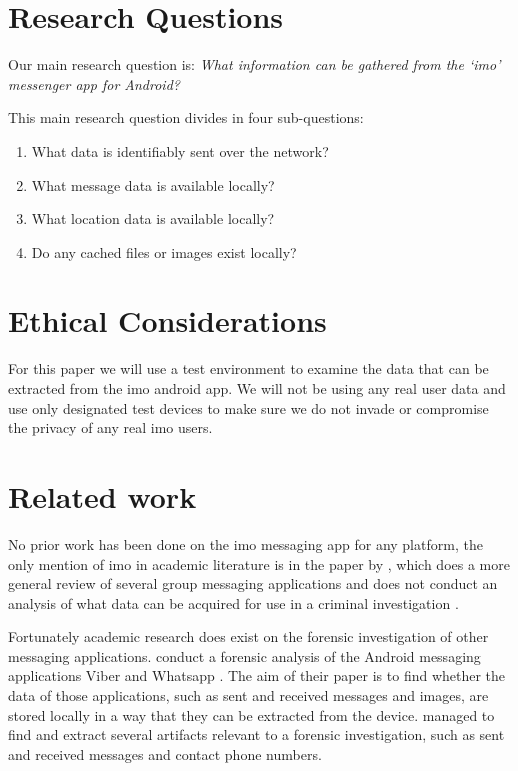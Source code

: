 \documentclass[conference]{IEEEtran}
\begin{document}
\section{Research Questions}\label{sec:researchq}

Our main research question is:
{\it What information can be gathered from the `imo' messenger app for Android?}

This main research question divides in four sub-questions:

\begin{enumerate}
    \item What data is identifiably sent over the network?
    \item What message data is available locally?
    \item What location data is available locally?
    \item Do any cached files or images exist locally?
\end{enumerate}


\section{Ethical Considerations}\label{sec:ethics}

For this paper we will use a test environment to examine the data that can be
extracted from the imo android app. We will not be using any real user data and
use only designated test devices to make sure we do not invade or compromise the
privacy of any real imo users.


\section{Related work}\label{sec:relwork}

No prior work has been done on the imo messaging app for any platform, the only
mention of imo in academic literature is in the paper by \citeauthor{zhu}, which
does a more general review of several group messaging applications and does not
conduct an analysis of what data can be acquired for use in a criminal
investigation \cite{zhu}.

Fortunately academic research does exist on the forensic investigation of other
messaging applications. \citeauthor{mahajan2013forensic} conduct a forensic
analysis of the Android messaging applications Viber and Whatsapp
\cite{mahajan2013forensic}. The aim of their paper is to find whether the data
of those applications, such as sent and received messages and images, are stored
locally in a way that they can be extracted from the device.
\citeauthor{mahajan2013forensic} managed to find and extract several artifacts
relevant to a forensic investigation, such as sent and received messages and
contact phone numbers.
\end{document}
